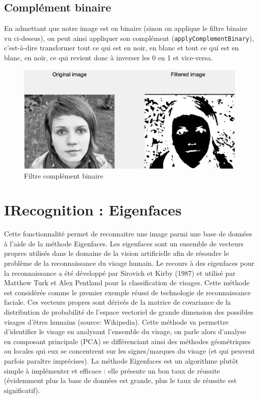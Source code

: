 \documentclass[12pt,a4paper]{article}
\begin{document}
\subsection{Complément binaire}
En admettant que notre image est en binaire (sinon on applique le filtre binaire vu ci-dessus), on peut ainsi appliquer son complément (\texttt{applyComplementBinary}), c'est-à-dire transformer tout ce qui est en noir, en blanc et tout ce qui est en blanc, en noir, ce qui revient donc à inverser les 0 en 1 et vice-versa.

\begin{figure}[H]
\centering
\includegraphics[scale=0.5]{img/complement-binary}
\caption{Filtre complément binaire}
\end{figure}


\section{IRecognition : Eigenfaces}
Cette fonctionnalité permet de reconnaitre une image parmi une base de données à l'aide de la méthode Eigenfaces. Les eigenfaces sont un ensemble de vecteurs propres utilisés dans le domaine de la vision artificielle afin de résoudre le problème de la reconnaissance du visage humain. Le recours à des eigenfaces pour la reconnaissance a été développé par Sirovich et Kirby (1987) et utilisé par Matthew Turk et Alex Pentland pour la classification de visages. Cette méthode est considérée comme le premier exemple réussi de technologie de reconnaissance faciale. Ces vecteurs propres sont dérivés de la matrice de covariance de la distribution de probabilité de l'espace vectoriel de grande dimension des possibles visages d'êtres humains (source: Wikipedia). 
\newline
Cette méthode va permettre d'identifier le visage en analysant l'ensemble du visage, on parle alors d'analyse en composant principale (PCA) se différenciant ainsi des méthodes géométriques ou locales qui eux se concentrent sur les signes/marques du visage (et qui peuvent parfois paraître imprécises). La méthode Eigenfaces est un algorithme plutôt simple à implémenter et efficace : elle présente un bon taux de réussite (évidemment plus la base de données est grande, plus le taux de réussite est significatif).
\end{document}
